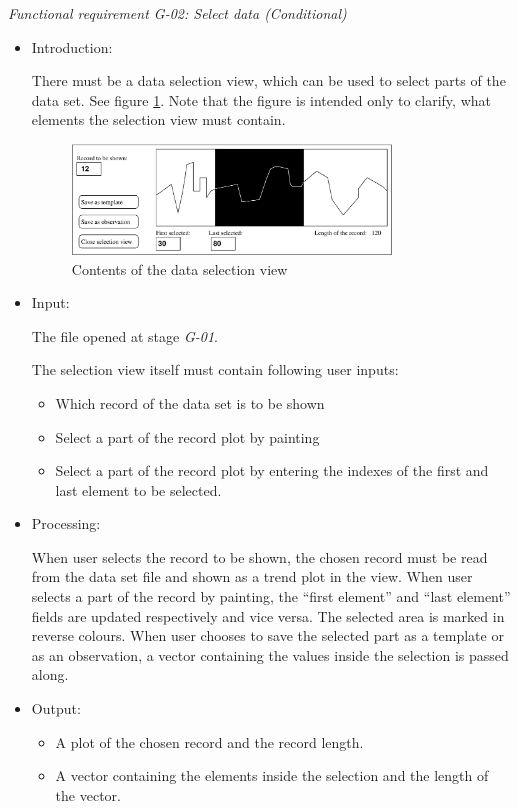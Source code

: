 \documentclass[a4paper,11pt]{article}
\begin{document}
\noindent \emph{Functional requirement G-02: Select data (Conditional)}
\begin{itemize}
\item Introduction:

There must be a data selection view, which can be used to select parts of the data set. See figure \ref{fig:selview}. Note
that the figure is intended only to clarify, what elements the selection view must contain.

\begin{figure} 
\begin{center} 
\includegraphics[width=0.8\textwidth]{srs_selview.eps}
\caption{Contents of the data selection view} 
\label{fig:selview}
\end{center} 
\end{figure}

\item Input:

The file opened at stage \emph{G-01}. 

The selection view itself must contain following user inputs:
\begin{itemize}
\item Which record of the data set is to be shown
\item Select a part of the record plot by painting
\item Select a part of the record plot by entering the indexes of the first and last element to be selected.
\end{itemize}
\item Processing:

When user selects the record to be shown, the chosen record must be read from the data set file and shown as a 
trend plot in the view. When user selects a part of the record by painting, the ``first element'' and ``last 
element'' fields are updated respectively and vice versa. The selected area is marked in reverse colours. 
When user chooses to save the selected part as a template or as an observation, a vector containing the values
inside the selection is passed along.
\item Output:

\begin{itemize}
\item A plot of the chosen record and the record length.
\item A vector containing the elements inside the selection and the length of the vector.
\end{itemize}
\end{itemize}
\end{document}

